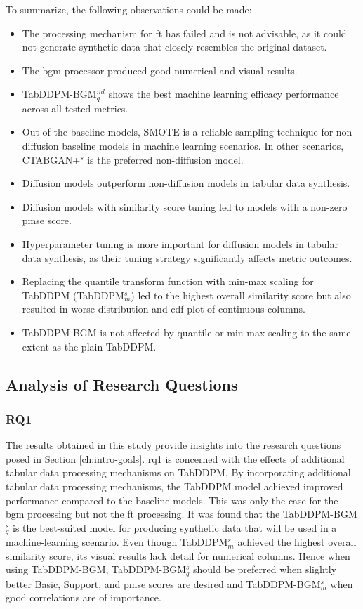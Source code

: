 To summarize, the following observations could be made:

\begin{itemize}
	\item The processing mechanism for \gls{ft} has failed and is not advisable, as it could not generate synthetic data that closely resembles the original dataset.
	\item The \gls{bgm} processor produced good numerical and visual results.
	\item TabDDPM-BGM$^{ml}_q$ shows the best machine learning efficacy performance across all tested metrics.
	\item Out of the baseline models, SMOTE is a reliable sampling technique for non-diffusion baseline models in machine learning scenarios.
	      In other scenarios, CTABGAN+$^{s}$ is the preferred non-diffusion model.
	\item Diffusion models outperform non-diffusion models in tabular data synthesis.
	\item Diffusion models with similarity score tuning led to models with a non-zero \gls{pmse} score.
	\item Hyperparameter tuning is more important for diffusion models in tabular data synthesis, as their tuning strategy significantly affects metric outcomes.
	\item Replacing the quantile transform function with min-max scaling for TabDDPM (TabDDPM$^{s}_m$) led to the highest overall similarity score but also resulted in worse distribution and \gls{cdf} plot of continuous columns.
	\item TabDDPM-BGM is not affected by quantile or min-max scaling to the same extent as the plain TabDDPM.
\end{itemize}

\subsection*{Analysis of Research Questions}

\subsubsection{RQ1}

The results obtained in this study provide insights into the research questions posed in Section \ref{ch:intro-goals}.
\gls{rq}1 is concerned with the effects of additional tabular data processing mechanisms on TabDDPM.
By incorporating additional tabular data processing mechanisms, the TabDDPM model achieved improved performance compared to the baseline models.
This was only the case for the \gls{bgm} processing but not the \gls{ft} processing.
It was found that the TabDDPM-BGM$^{s}_q$ is the best-suited model for producing synthetic data that will be used in a machine-learning scenario.
Even though TabDDPM$^{s}_m$ achieved the highest overall similarity score, its visual results lack detail for numerical columns.
Hence when using TabDDPM-BGM, TabDDPM-BGM$^{s}_q$ should be preferred when slightly better Basic, Support, and \gls{pmse} scores are desired and TabDDPM-BGM$^{s}_m$ when good correlations are of importance.


